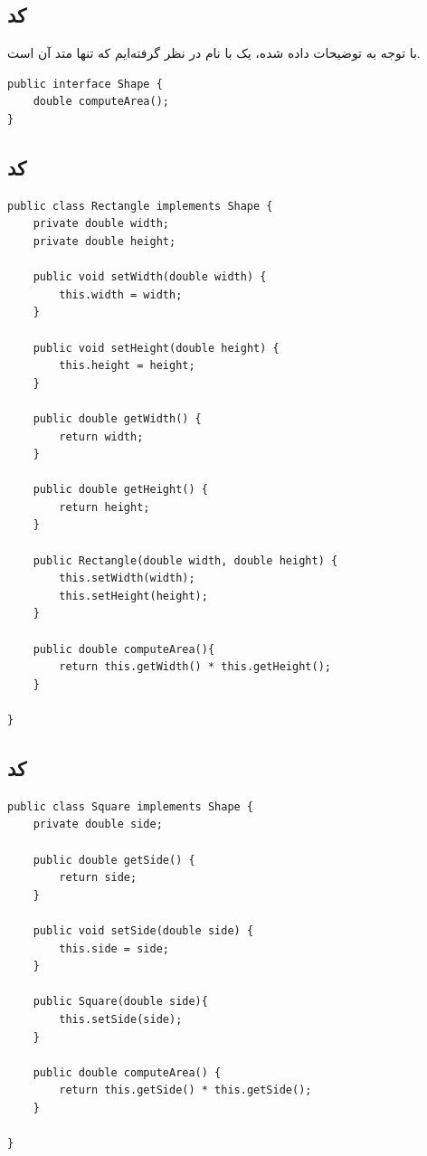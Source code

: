 \subsection*{کد }
با توجه به توضیحات داده شده، یک  با نام  در نظر گرفته‌ایم که تنها متد آن  است.

\begin{Verbatim}[tabsize=4]
public interface Shape {
	double computeArea();
}
\end{Verbatim}

\subsection*{کد }

\begin{Verbatim}[tabsize=4]
public class Rectangle implements Shape {
	private double width;
	private double height;
	
	public void setWidth(double width) {
		this.width = width;
	}
	
	public void setHeight(double height) {
		this.height = height;
	}
	
	public double getWidth() {
		return width;
	}
	
	public double getHeight() {
		return height;
	}
	
	public Rectangle(double width, double height) {
		this.setWidth(width);
		this.setHeight(height);
	}
	
	public double computeArea(){
		return this.getWidth() * this.getHeight();
	}

}
\end{Verbatim}

\subsection*{کد }

\begin{Verbatim}[tabsize=4]
public class Square implements Shape {
	private double side;
	
	public double getSide() {
		return side;
	}
	
	public void setSide(double side) {
		this.side = side;
	}
	
	public Square(double side){
		this.setSide(side);
	}
	
	public double computeArea() {
		return this.getSide() * this.getSide();
	}

}
\end{Verbatim}

